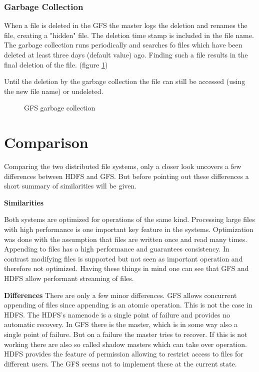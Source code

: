 \documentclass{sig-alternate}
\begin{document}
\subsubsection{Garbage Collection}
\label{gfs_gc}
When a file is deleted in the GFS the master logs the deletion and renames the file, creating a "hidden" file. The deletion time stamp is included in the file name. The garbage collection runs periodically and searches fo files which have been deleted at least three days (default value) ago. Finding such a file results in the final deletion of the file. (figure \ref{fig:gfs_gc})

Until the deletion by the garbage collection the file can still be accessed (using the new file name) or undeleted.

\begin{figure}[!hbt]
\centering
{}
\caption{GFS garbage collection}
\label{fig:gfs_gc}
\end{figure}

\section{Comparison}
Comparing the two distributed file systems, only a closer look uncovers a few differences between HDFS and GFS. But before pointing out these differences a short summary of similarities will be given.\cite{comparison1}

\textbf{Similarities}

Both systems are optimized for operations of the same kind. Processing large files with high performance is one important key feature in the systems. Optimization was done with the assumption that files are written once and read many times. Appending to files has a high performance and guarantees consistency. In contrast modifying files is supported but not seen as important operation and therefore not optimized.
Having these things in mind one can see that GFS and HDFS allow performant streaming of files.

\textbf{Differences}
There are only a few minor differences. GFS allows concurrent appending of files since appending is an atomic operation. This is not the case in HDFS.
The HDFS's namenode is a single point of failure and provides no automatic recovery. In GFS there is the master, which is in some way also a single point of failure. But on a failure the master tries to recover. If this is not working there are also so called shadow masters which can take over operation.
HDFS provides the feature of permission allowing to restrict access to files for different users. The GFS seems not to implement these at the current state.
\end{document}
